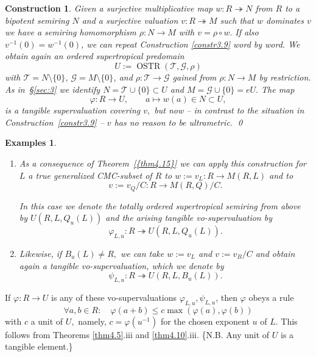 \documentclass [12pt,a4paper,reqno]{amsart}
\newtheorem{examples}[thm]{Examples}
\newtheorem{construction}[thm]{Construction}
\begin{document}
\begin{construction}
 Given a surjective multiplicative map $w:R\twoheadrightarrow N$
 from $R$ to a bipotent semiring $N$ and a surjective valuation $v:
 R\twoheadrightarrow M$ such that $w$ dominates $v$ we have a
 semiring homomorphism $\rho: N\to M$ with $v=\rho\circ w.$ If
 also $v^{-1}(0)=w^{-1}(0)$, we can repeat Construction
 \ref{constr3.9} word by word. We obtain again an ordered
 supertropical predomain
 $$U:={\operatorname{OSTR}}({\mathcal T},{\mathcal G} ,\rho)$$
 with ${\mathcal T}=N\setminus\{0\}$, ${\mathcal G} =M\setminus \{0\}$, and
 $\rho: {\mathcal T}\to {\mathcal G} $ gained from $\rho:N\to M$ by
 restriction. As in~\S\ref{sec:3} we identify $N={\mathcal T}\cup\{0\}\subset U$ and
 $M={\mathcal G} \cup\{0\}=eU.$ The map
 $$\varphi: R\to U,\qquad a\mapsto w(a)\in N\subset U,$$
 is a tangible supervaluation covering $v,$ but now -- in contrast
 to the situation in Construction~\ref{constr3.9} -- $v$ has no
 reason to be ultrametric. { \hfill\quad\qed} \end{construction}

\begin{examples}\label{examps4.17} $ $
\begin{enumerate}
    \item[a)] As a consequence of {Theorem~\ref{{thm4.15}}} we can apply this
construction for $L$  a true generalized CMC-subset of $R$ to
$w:=v_L:R\to M(R,L)$ and to $$v:=v_{Q}/C:R\to M(R,Q)/C.$$

 In this
case we denote the totally ordered supertropical semiring from
above by $U(R,L,Q_u(L))$ and the arising tangible
vo-supervaluation by
$$\varphi_{L,u}:R \twoheadrightarrow U(R,L,Q_u(L)).$$

\item[b)] Likewise, if $B_u(L)\ne R,$ we can take $w:=v_L$ and
$v:=v_B/C$ and obtain again a tangible  vo-supervaluation, which
we denote by
$$\psi_{L,u}:R\twoheadrightarrow U(R,L,B_u(L)).$$ \end{enumerate}

\end{examples}

If $\varphi: R\to U$ is any of these vo-supervaluations
$\varphi_{L,u},\psi_{L,u}$, then $\varphi$ obeys a rule
\begin{equation}\label{4.6} \forall a,b \in R: \quad
\varphi(a+b)\le c \max(\varphi(a),\varphi(b))\end{equation} with
$c$ a unit of $U,$ namely, $c =\varphi(u^{-1})$ for the chosen
exponent $u$ of $L.$ This follows from Theorems \ref{thm4.5}.iii
and \ref{thm4.10}.iii. \{N.B. Any unit of $U$ is a tangible
element.\}
\end{document}
